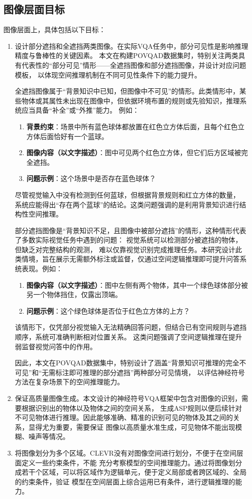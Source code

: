 \subsection{图像层面目标}
图像层面上，具体包括以下目标：
\begin{enumerate}[nosep]
\item 设计部分遮挡和全遮挡两类图像。在实际VQA任务中，部分可见性是影响推理精度与鲁棒性的关键因素。
本文在构建POV\-QAD数据集时，特别关注两类具有代表性的“部分可见”情形——全遮挡图像和部分遮挡图像，并设计对应问题模板， 
以体现空间推理机制在不同可见性条件下的能力提升。

全遮挡图像属于“背景知识中已知，但图像中不可见”的情形。此类情形中，某些物体或其属性未出现在图像中，但依据环境布置的规则或先验知识，推理系统应当具备“补全”或“外推”能力。
例如：
\begin{enumerate}[nosep]
\item \textbf{背景约束}：场景中所有蓝色球体都放置在红色立方体后面，且每个红色立方体后面恰好有一个蓝球。
\item \textbf{图像内容（以文字描述）}：图中可见两个红色立方体，但它们后方区域被完全遮挡。
\item \textbf{问题示例}：这个场景中是否存在蓝色球体？
\end{enumerate}
尽管视觉输入中没有检测到任何蓝球，但根据背景规则和红立方体的数量，
系统应能得出“存在两个蓝球”的结论。这类问题强调的是利用背景知识进行结构性空间推理。

部分遮挡图像是“背景知识不足，且图像中被部分遮挡”的情形，这种情形代表了多数实际视觉任务中遇到的问题：
视觉系统可以检测部分被遮挡的物体，但缺乏对完整结构的观测，
难以仅靠视觉识别完成推理任务。本研究设计此类情境，旨在展示无需额外标注或监督，仅通过空间逻辑推理即可提升问答系统表现。例如：
\begin{enumerate}[nosep]
\item \textbf{图像内容（以文字描述）}：图中左侧有两个物体，其中一个绿色球体部分被另一个物体挡住，仅露出顶端。
\item \textbf{问题示例}：这个绿色球体是否位于红色立方体的上方？
\end{enumerate}
该情形下，仅凭部分视觉输入无法精确回答问题，但结合已有空间规则与遮挡顺序，系统可准确判断相对位置关系。
这类问题强调了空间逻辑推理在提升弱监督视觉问答中的作用。

因此，本文在POVQAD数据集中，特别设计了涵盖“背景知识可推理的完全不可见”和“无需标注即可推理的部分遮挡”两种部分可见情境，
以评估神经符号方法在复杂场景下的空间推理能力。
\item 保证高质量图像生成。本文设计的神经符号VQA框架中包含对图像的识别，需要根据识别出的物体以及物体之间的空间关系，
生成ASP规则以便后续针对不可见物体进行推理。因此能够准确、精准的识别可见的物体及其之间的关系，显得尤为重要，需要保证
图像以高质量水准生成，可见物体不能出现模糊、噪声等情况。
\item 将图像划分为多个区域。CLEVR没有对图像空间进行划分，不便于在空间层面定义一些约束条件，不能
充分考察模型的空间推理能力。通过将图像划分成若干个区域，可以将区域作为逻辑单元，便于定义局部或者跨区域的、全局的约束条件，验证
模型在空间层面上综合运用已有条件，进行逻辑推理的能力。
\end{enumerate}
